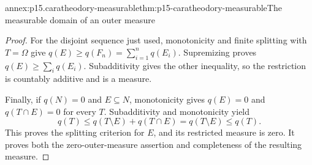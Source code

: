 \begin{annexitem}{annex:p15.caratheodory-measurable}{thm:p15-caratheodory-measurable}{The measurable domain of an outer measure}
\begin{proof}
For the disjoint sequence just used, monotonicity and finite splitting
with \(T=\Omega\) give
\(q(E)\geq q(F_n)=\sum_{i=1}^n q(E_i)\). Supremizing proves
\(q(E)\geq\sum_i q(E_i)\). Subadditivity gives the other inequality,
so the restriction is countably additive and is a measure.

Finally, if \(q(N)=0\) and \(E\subseteq N\), monotonicity gives
\(q(E)=0\) and \(q(T\cap E)=0\) for every \(T\). Subadditivity
and monotonicity yield
\[
 q(T)\leq q(T\setminus E)+q(T\cap E)
       =q(T\setminus E)\leq q(T).
\]
This proves the splitting criterion for \(E\), and its restricted
measure is zero. It proves both the zero-outer-measure assertion and
completeness of the resulting measure.
\end{proof}
\end{annexitem}

